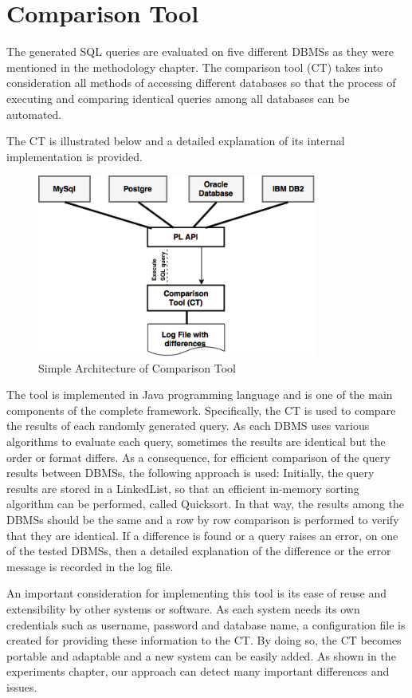 \section{Comparison Tool} 
The generated SQL queries are evaluated on five different DBMSs as they were mentioned in the methodology chapter. The comparison tool (CT) takes into consideration all methods of accessing different databases so that the process of executing and comparing identical queries among all databases can be automated.

The CT is illustrated below and  a detailed explanation of its internal implementation is provided.
 \begin{figure} 
      \centering
      \includegraphics[width=\textwidth,height=6cm]{Images/2-ComparisonTool}
      \caption{Simple Architecture of Comparison Tool}
      \label{fig:counting-methods}
  \end{figure}

The tool is implemented in Java programming language and is one of the main components of the complete framework. Specifically, the CT is used to compare the results of each randomly generated query. As each DBMS uses various algorithms to evaluate each query, sometimes the results are identical but the order or format differs. As a consequence, for efficient comparison of the query results between DBMSs, the following approach is used: Initially, the query results are stored in a LinkedList, so that an efficient in-memory sorting algorithm can be performed, called Quicksort. In that way, the results among the DBMSs should be the same and a row by row comparison is performed to verify that they are identical. If a difference is found or a query raises an error, on one of the tested DBMSs, then a detailed explanation of the difference or the error message is recorded in the log file.


An important consideration for implementing this tool is its ease of reuse and extensibility by other systems or software. As each system needs its own credentials such as username, password and database name, a configuration file is created for providing these information to the CT. By doing so, the CT becomes portable and adaptable and a new system can be easily added. As shown in the experiments chapter, our approach can detect many important differences and issues. 

